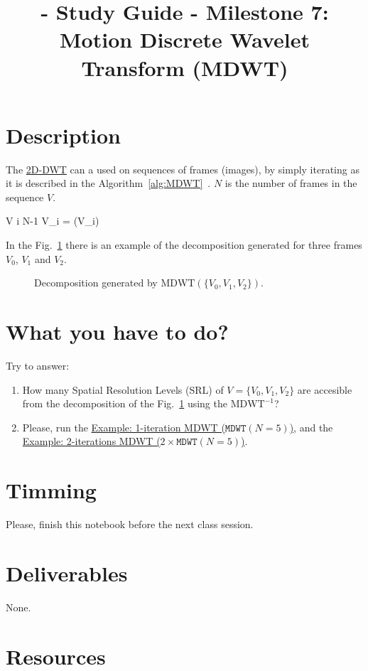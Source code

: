 
\title{\SM{} - Study Guide - Milestone 7: Motion Discrete Wavelet Transform (MDWT)}

\maketitle

\section{Description}

The
\href{https://sistemas-multimedia.github.io/study_guide/06-2D-DWT/}{2D-DWT}
can a used on sequences of frames (images), by simply iterating as it
is described in the
Algorithm~\ref{alg:MDWT}~\cite{taubman2002jpeg2000}. $N$ is the number
of frames in the sequence $V$.

\begin{pseudocode}{}{V}
  \label{alg:MDWT}
  \FOR i  \TO N-1 \DO
  V_i = (V_i)
\end{pseudocode}

In the Fig.~\ref{fig:MDWT} there is an example of the decomposition
generated for three frames $V_0$, $V_1$ and $V_2$.

\begin{figure}
  \centering
  \caption{Decomposition generated by $\text{MDWT}(\{V_0, V_1, V_2\})$.}
  \label{fig:MDWT}
\end{figure}

\section{What you have to do?}

Try to answer:
\begin{enumerate}
\item How many Spatial Resolution Levels (SRL) of
  $V=\{V_0, V_1, V_2\}$ are accesible from the decomposition of the
  Fig.~\ref{fig:MDWT} using the $\text{MDWT}^{-1}$?
\item Please, run the
  \href{https://sistemas-multimedia.github.io/MRVC/#x1-80004.1}{Example:
    1-iteration MDWT ($\mathtt{MDWT}(N=5)$)}, and the
  \href{https://sistemas-multimedia.github.io/MRVC/#x1-90004.2}{Example:
    2-iterations MDWT ($2\times\mathtt{MDWT}(N=5)$)}.
\end{enumerate}

\section{Timming}

Please, finish this notebook before the next class session.

\section{Deliverables}

None.

\section{Resources}


